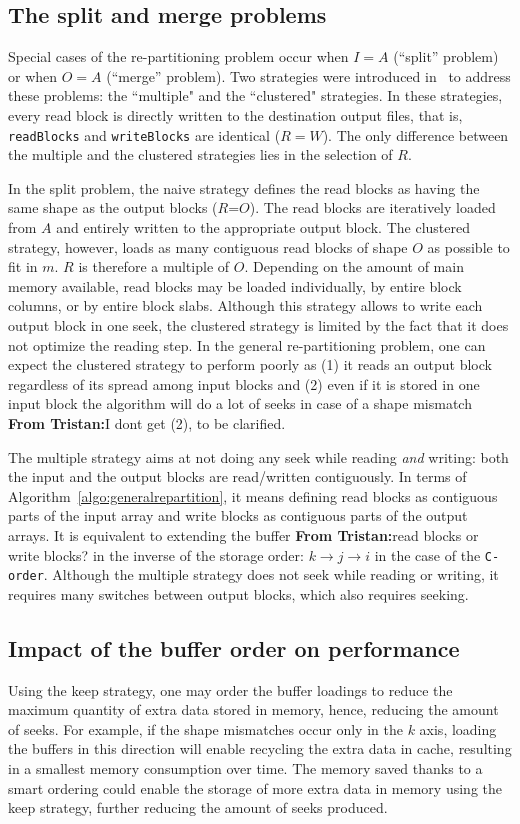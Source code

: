 \documentclass[sigconf, nonacm]{acmart}
\newcommand{\tristan}[1]{\color{orange}\textbf{From Tristan:}#1\color{black}}
\begin{document}
\subsection{The split and merge problems}

Special cases of the re-partitioning problem occur when $I=A$ (``split'' problem)
or when $O=A$ (``merge'' problem). Two strategies were introduced
in~\cite{seqalgorithms} to address these problems: the ``multiple" and the
``clustered" strategies. In these strategies, every read block is directly written to the
destination output files, that is, \texttt{readBlocks} and \texttt{writeBlocks} are identical ($R=W$).
The only difference between the multiple and the clustered strategies lies in
the selection of $R$.

In the split problem, the naive
strategy defines the read blocks as having the same shape as the output blocks
($R$=$O$). The read blocks are iteratively loaded from $A$ and entirely written
to the appropriate output block.
The clustered strategy, however, loads as
many contiguous read blocks of shape $O$ as possible to fit in $m$.
$R$ is therefore a multiple of $O$.
Depending on the amount of main memory available, read blocks may be loaded
individually, by entire block columns, or by entire block slabs.
Although this strategy allows to write each output block in one seek, the clustered strategy is limited by the fact
that it does not optimize the reading step.
In the general re-partitioning problem, one can expect the clustered strategy to
perform poorly as
(1) it reads an output block regardless of its spread among input blocks
and (2) even if it is stored in one input block the algorithm will do a lot of seeks in
case of a shape mismatch \tristan{I dont get (2), to be clarified}.

The multiple strategy
aims at not doing any seek while reading \textit{and} writing:
both the input and the output blocks are read/written contiguously. In
terms of Algorithm~\ref{algo:generalrepartition}, it means defining read blocks as
contiguous parts of the input array and write blocks as contiguous parts of
the output arrays. It is equivalent to extending the buffer \tristan{read blocks or write blocks?} in the inverse of
the storage order: $k \rightarrow j \rightarrow i$ in the case
of the \texttt{C-order}. Although the multiple strategy does not seek while reading or writing, it
requires many switches between output blocks, which also requires seeking.

\subsection{Impact of the buffer order on performance}
Using the keep strategy, one may order the buffer loadings to reduce the maximum
quantity of extra data stored in memory, hence, reducing the amount of seeks.
For example, if the shape mismatches occur only in the $k$ axis, loading the
buffers in this direction will enable recycling the extra data in cache,
resulting in a smallest memory consumption over time.
The memory saved thanks to a smart
ordering could enable the storage of more extra data in memory using the
keep strategy, further reducing the amount of seeks produced.
\end{document}
